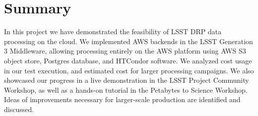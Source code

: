 \section{Summary}

In this \poc project we have demonstrated the feasibility of LSST DRP data processing on the cloud.
We implemented AWS backends in the LSST Generation 3 Middleware, allowing processing entirely on the AWS platform using AWS S3 object store, Postgres database, and HTCondor software.
We analyzed cost usage in our test execution, and estimated cost for larger processing campaigns.
We also showcased our progress in a live demonstration in the LSST Project Community Workshop, as well as a hands-on tutorial in the Petabytes to Science Workshop.
Ideas of improvements necessary for larger-scale production are identified and discussed.
